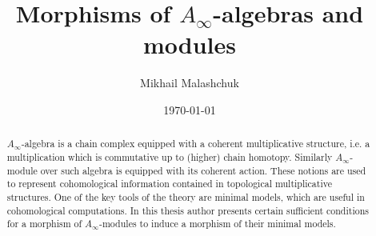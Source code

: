 \documentclass[a4paper, 12pt, openany, fleqn]{amsart}
\author{Mikhail Malashchuk}
\title{Morphisms of $A_\infty$-algebras and modules}
\date{\today}
\begin{document}
\begin{abstract}
    $A_\infty$-algebra is a chain complex equipped with a coherent multiplicative structure, i.e. a multiplication which is commutative up to (higher) chain homotopy. Similarly $A_\infty$-module over such algebra is equipped with its coherent action. These notions are used to represent cohomological information contained in topological multiplicative structures. One of the key tools of the theory are minimal models, which are useful in cohomological computations. In this thesis author presents certain sufficient conditions for a morphism of $A_\infty$-modules to induce a morphism of their minimal models.
\end{abstract}

\maketitle
\end{document}

